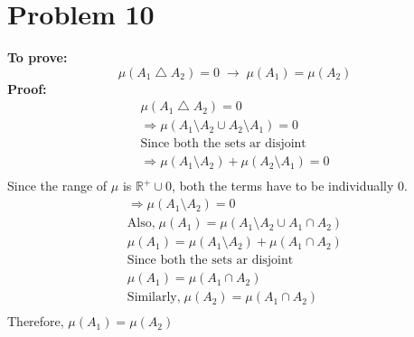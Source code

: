 \documentclass[paper=a4, fontsize=11pt]{scrartcl} %
\numberwithin{equation}{section} %
\numberwithin{figure}{section} %
\numberwithin{table}{section} %
\begin{document}
\section{Problem 10}
\textbf{To prove:}\\
\begin{equation}
	\mu (A_1\bigtriangleup A_2)=0\; \rightarrow \; \mu(A_1)=\mu(A_2)
\end{equation}
\textbf{Proof:}\\
\begin{align*}
	\mu(A_1\bigtriangleup A_2)=0\\
	\Rightarrow \mu(A_1\setminus A_2\cup  A_2\setminus 	A_1)=0\\
		\text{Since both the sets ar disjoint}\\
	\Rightarrow \mu(A_1\setminus A_2) + \mu(A_2\setminus A_1)=0\\
\end{align*}
Since the range of $\mu$ is $\mathbb{R}^+\cup 0$, both the terms have to be individually 0.\\
\begin{align*}
	\Rightarrow \mu(A_1\setminus A_2) = 0\\
	\text{Also,}\; \mu(A_1) = \mu(A_1\setminus A_2 \cup A_1\cap A_2)\\
	\mu(A_1) = \mu(A_1\setminus A_2) + \mu(A_1\cap A_2)\\
	\text{Since both the sets ar disjoint}\\
	\mu(A_1) = \mu(A_1\cap A_2)\\
	\text{Similarly,}\; \mu(A_2) = \mu(A_1\cap A_2)\\
\end{align*}
Therefore, $\mu(A_1) = \mu(A_2)$
\end{document}
